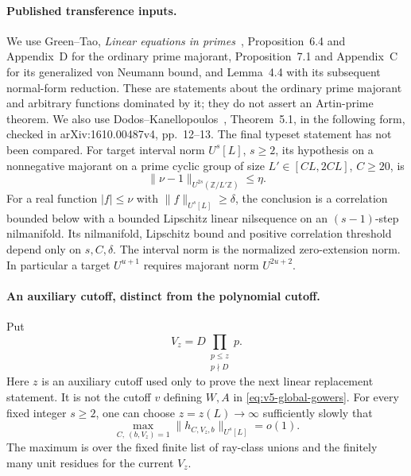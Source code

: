 \documentclass[11pt]{article}
\theoremstyle{definition}
\theoremstyle{remark}
\newcommand{\Z}{\mathbb Z}
\begin{document}
\paragraph{Published transference inputs.}
We use Green--Tao, \emph{Linear equations in primes}~\cite{greentao},
Proposition~6.4 and Appendix~D for the ordinary prime majorant,
Proposition~7.1 and Appendix~C for its generalized von Neumann bound,
and Lemma~4.4 with its subsequent normal-form reduction.
These are statements about the ordinary prime majorant and arbitrary
functions dominated by it; they do not assert an Artin-prime theorem.
We also use Dodos--Kanellopoulos~\cite{v5dk}, Theorem~5.1, in the
following form, checked in arXiv:1610.00487v4, pp.~12--13. The final
typeset statement has not been compared. For target interval norm $U^s[L]$, $s\geq2$, its hypothesis on a
nonnegative majorant on a prime cyclic group of size
$L'\in[CL,2CL]$, $C\geq20$, is
\begin{equation}\label{eq:gaussian-dk-correct-exponent}
 \|\nu-1\|_{U^{2s}(\Z/L'\Z)}\leq\eta.
\end{equation}
For a real function $|f|\leq\nu$ with $\|f\|_{U^s[L]}\geq\delta$,
the conclusion is a correlation bounded below with a bounded Lipschitz
linear nilsequence on an $(s-1)$-step nilmanifold. Its nilmanifold,
Lipschitz bound and positive correlation threshold depend only on
$s,C,\delta$. The interval norm is the normalized zero-extension norm.
In particular a target $U^{u+1}$ requires majorant norm $U^{2u+2}$.

\paragraph{An auxiliary cutoff, distinct from the polynomial cutoff.}
Put
\[
 V_z=D\prod_{\substack{p\leq z\\p\nmid D}}p.
\]
Here $z$ is an auxiliary cutoff used only to prove the next linear
replacement statement. It is not the cutoff $v$ defining $W,A$ in
\eqref{eq:v5-global-gowers}.
For every fixed integer $s\geq2$, one can choose $z=z(L)\to\infty$
sufficiently slowly that
\begin{equation}\label{eq:gaussian-refined-gowers}
 \max_{C,\ (b,V_z)=1}\|h_{C,V_z,b}\|_{U^s[L]}=o(1).
\end{equation}
The maximum is over the fixed finite list of ray-class unions and the
finitely many unit residues for the current $V_z$.
\end{document}
